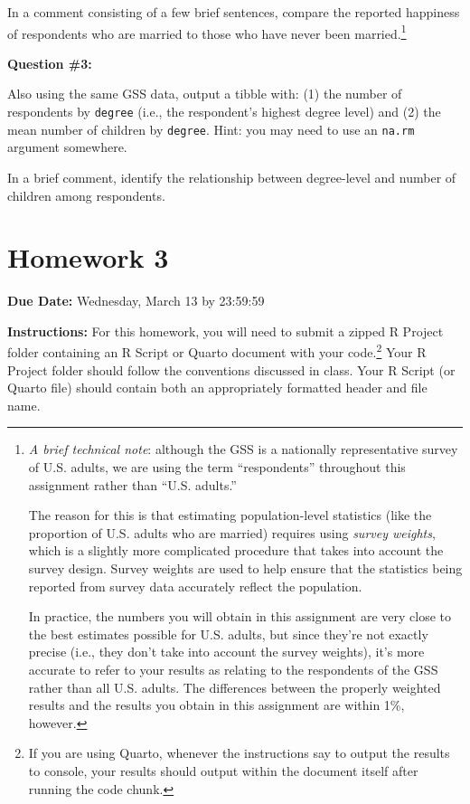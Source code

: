 \documentclass[
  letterpaper,
]{book}
\begin{document}
In a comment consisting of a few brief sentences, compare the reported
happiness of respondents who are married to those who have never been
married.\footnote{\emph{A brief technical note}: although the GSS is a
  nationally representative survey of U.S. adults, we are using the term
  ``respondents'' throughout this assignment rather than ``U.S.
  adults.''

  The reason for this is that estimating population-level statistics
  (like the proportion of U.S. adults who are married) requires using
  \emph{survey weights}, which is a slightly more complicated procedure
  that takes into account the survey design. Survey weights are used to
  help ensure that the statistics being reported from survey data
  accurately reflect the population.

  In practice, the numbers you will obtain in this assignment are very
  close to the best estimates possible for U.S. adults, but since
  they're not exactly precise (i.e., they don't take into account the
  survey weights), it's more accurate to refer to your results as
  relating to the respondents of the GSS rather than all U.S. adults.
  The differences between the properly weighted results and the results
  you obtain in this assignment are within 1\%, however.}

\textbf{Question \#3:}

Also using the same GSS data, output a tibble with: (1) the number of
respondents by \texttt{degree} (i.e., the respondent's highest degree
level) and (2) the mean number of children by \texttt{degree}. Hint: you
may need to use an \texttt{na.rm} argument somewhere.

In a brief comment, identify the relationship between degree-level and
number of children among respondents.

\hypertarget{homework-3}{%
\chapter*{Homework 3}\label{homework-3}}


\textbf{Due Date:} Wednesday, March 13 by 23:59:59

\textbf{Instructions:} For this homework, you will need to submit a
zipped R Project folder containing an R Script or Quarto document with
your code.\footnote{If you are using Quarto, whenever the instructions
  say to output the results to console, your results should output
  within the document itself after running the code chunk.} Your R
Project folder should follow the conventions discussed in class. Your R
Script (or Quarto file) should contain both an appropriately formatted
header and file name.
\end{document}
